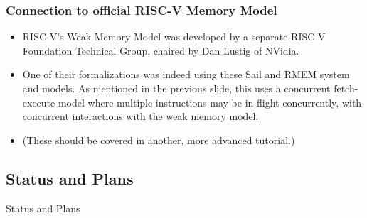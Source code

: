 \documentclass[aspectratio=169]{beamer}
\newcommand{\slidefont}{\scriptsize}
\begin{document}
\begin{frame}[fragile]
  \frametitle{Connection to official RISC-V Memory Model}

  \slidefont

  \begin{itemize}
  \item
    RISC-V's Weak Memory Model was developed by a separate RISC-V
    Foundation Technical Group, chaired by Dan Lustig of NVidia.

  \item 
    One of their formalizations was indeed using these Sail and RMEM
    system and models.  As mentioned in the previous slide, this uses
    a concurrent fetch-execute model where multiple instructions may
    be in flight concurrently, with concurrent interactions with the
    weak memory model.

  \item
    (These should be covered in another, more advanced tutorial.)

  \end{itemize}

\end{frame}


\subsection{Status and Plans}


\begin{frame}[fragile]

  \slidefont

  \vfill

  \begin{center}\LARGE
    Status and Plans
  \end{center}

  \vfill

\end{frame}

\end{document}
